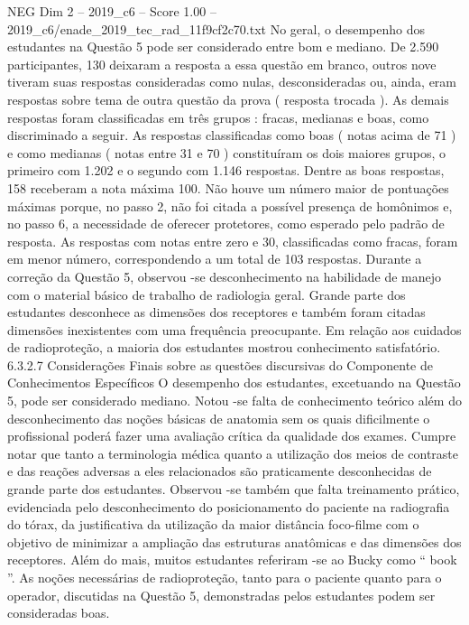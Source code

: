 \begin{textsample}{NEG Dim 2 – 2019\_c6 – Score 1.00 – 2019\_c6/enade\_2019\_tec\_rad\_11f9cf2c70.txt}
No geral, o desempenho dos estudantes na Questão 5 pode ser considerado entre bom e mediano.
De 2.590 participantes, 130 deixaram a resposta a essa questão em branco, outros nove tiveram suas respostas consideradas como nulas, desconsideradas ou, ainda, eram respostas sobre tema de outra questão da prova ( resposta trocada ).
As demais respostas foram classificadas em três grupos : fracas, medianas e boas, como discriminado a seguir.
As respostas classificadas como boas ( notas acima de 71 ) e como medianas ( notas entre 31 e 70 ) constituíram os dois maiores grupos, o primeiro com 1.202 e o segundo com 1.146 respostas.
Dentre as boas respostas, 158 receberam a nota máxima 100.
Não houve um número maior de pontuações máximas porque, no passo 2, não foi citada a possível presença de homônimos e, no passo 6, a necessidade de oferecer protetores, como esperado pelo padrão de resposta.
As respostas com notas entre zero e 30, classificadas como fracas, foram em menor número, correspondendo a um total de 103 respostas.
Durante a correção da Questão 5, observou -se desconhecimento na habilidade de manejo com o material básico de trabalho de radiologia geral.
Grande parte dos estudantes desconhece as dimensões dos receptores e também foram citadas dimensões inexistentes com uma frequência preocupante.
Em relação aos cuidados de radioproteção, a maioria dos estudantes mostrou conhecimento satisfatório. 6.3.2.7 Considerações Finais sobre as questões discursivas do Componente de Conhecimentos Específicos O desempenho dos estudantes, excetuando na Questão 5, pode ser considerado mediano.
Notou -se falta de conhecimento teórico além do desconhecimento das noções básicas de anatomia sem os quais dificilmente o profissional poderá fazer uma avaliação crítica da qualidade dos exames.
Cumpre notar que tanto a terminologia médica quanto a utilização dos meios de contraste e das reações adversas a eles relacionados são praticamente desconhecidas de grande parte dos estudantes.
Observou -se também que falta treinamento prático, evidenciada pelo desconhecimento do posicionamento do paciente na radiografia do tórax, da justificativa da utilização da maior distância foco-filme com o objetivo de minimizar a ampliação das estruturas anatômicas e das dimensões dos receptores.
Além do mais, muitos estudantes referiram -se ao Bucky como “ book ”.
As noções necessárias de radioproteção, tanto para o paciente quanto para o operador, discutidas na Questão 5, demonstradas pelos estudantes podem ser consideradas boas.

\end{textsample}
